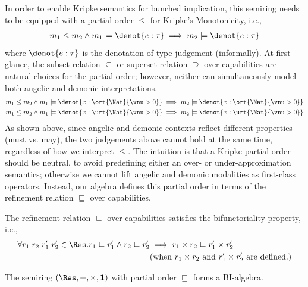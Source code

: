 \begin{definition}
In order to enable Kripke semantics for bunched implication, this semiring needs to be equipped with a partial order $\leq$ for Kripke's Monotonicity, i.e.,
\begin{align*}
  m_1 \leq m_2 \land m_1 \models \denot{e : \tau} \implies m_2 \models \denot{e : \tau}
\end{align*}\noindent
where $\denot{e : \tau}$ is the denotation of type judgement
(informally). At first glance, the subset relation $\subseteq$ or
superset relation $\supseteq$ over capabilities are natural choices
for the partial order; however, neither can simultaneously model both
angelic and demonic interpretations.
\begin{align*}
  &m_1 \leq m_2 \land m_1 \models \denot{x : \ort{\Nat}{\vnu > 0}} \implies m_2 \models \denot{x : \ort{\Nat}{\vnu > 0}} \\
  &m_1 \leq m_2 \land m_1 \models \denot{x : \urt{\Nat}{\vnu > 0}} \implies m_2 \models \denot{x : \urt{\Nat}{\vnu > 0}}
\end{align*}\noindent
As shown above, since angelic and demonic contexts reflect different
properties (must vs. may), the two judgements above cannot hold at the
same time, regardless of how we interpret $\leq$.  The intuition is
that a Kripke partial order should be neutral, to avoid predefining
either an over- or under-approximation semantics; otherwise we cannot
lift angelic and demonic modalities as first-class operators. Instead,
our algebra defines this partial order in terms of the refinement
relation $\sqsubseteq$ over capabilities.

\begin{definition}[Bifunctoriality]\label{def:bifunctoriality}
  The refinement relation $\sqsubseteq$ over capabilities satisfies the bifunctoriality property, i.e.,
  \begin{align*}
    \forall r_1\;r_2\;r_1'\;r_2' \in \Res. r_1 \sqsubseteq r_1' \land r_2 \sqsubseteq r_2' &\implies r_1 \times r_2 \sqsubseteq r_1' \times r_2' 
    \\& (\text{when } r_1 \times r_2 \text{ and } r_1' \times r_2' \text{ are defined.})
  \end{align*}
\end{definition}

\begin{theorem}[BI-algebra]\label{thm:bi-algebra} The semiring $(\Res,{+},{\times},\mathbf{1})$ with partial order $\sqsubseteq$ forms a BI-algebra.
\end{theorem}


\end{definition}
